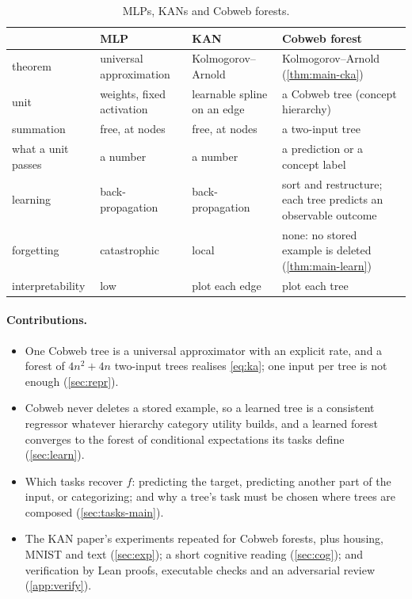 \begin{table}[t]
\centering\small
\begin{tabular}{@{}p{3.1cm}p{3.3cm}p{3.6cm}p{4.6cm}@{}}\toprule
 & MLP & KAN & Cobweb forest\\\midrule
theorem & universal approximation & Kolmogorov--Arnold & Kolmogorov--Arnold (\cref{thm:main-cka})\\
unit & weights, fixed activation & learnable spline on an edge & a Cobweb tree (concept hierarchy)\\
summation & free, at nodes & free, at nodes & a two-input tree\\
what a unit passes & a number & a number & a prediction or a concept label\\
learning & back-propagation & back-propagation & sort and restructure; each tree predicts an observable outcome\\
forgetting & catastrophic & local & none: no stored example is deleted (\cref{thm:main-learn})\\
interpretability & low & plot each edge & plot each tree\\
\bottomrule
\end{tabular}
\caption{MLPs, KANs and Cobweb forests.}
\label{tab:analogy}
\end{table}

\paragraph{Contributions.}
\begin{itemize}[leftmargin=*,noitemsep]
\item One Cobweb tree is a universal approximator with an explicit rate, and a forest of
  $4n^2+4n$ two-input trees realises \eqref{eq:ka}; one input per tree is not enough
  (\cref{sec:repr}).
\item Cobweb never deletes a stored example, so a learned tree is a consistent regressor
  whatever hierarchy category utility builds, and a learned forest converges to the forest
  of conditional expectations its tasks define (\cref{sec:learn}).
\item Which tasks recover $f$: predicting the target, predicting another part of the
  input, or categorizing; and why a tree's task must be chosen where trees are composed
  (\cref{sec:tasks-main}).
\item The KAN paper's experiments repeated for Cobweb forests, plus housing, MNIST and
  text (\cref{sec:exp}); a short cognitive reading (\cref{sec:cog}); and verification by
  Lean proofs, executable checks and an adversarial review (\cref{app:verify}).
\end{itemize}


